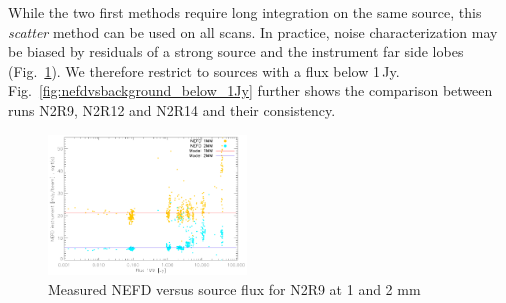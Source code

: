 While the two first methods require long integration on the same source, this
\emph{scatter} method can be used on all scans. In practice, noise
characterization may be biased by residuals of a strong source and the
instrument far side lobes (Fig.~\ref{fig:nefdvsbackground}). We therefore
restrict to sources with a flux below
1\,Jy. Fig.~\ref{fig:nefdvsbackground_below_1Jy} further shows the comparison
between runs N2R9, N2R12 and N2R14 and their consistency.

\begin{figure}
\begin{center}
\includegraphics[clip=true,width=0.47\textwidth]{Figures/NEFDIndScans/nefd_flux1mm_run22.pdf}
\caption[Measured NEFD versus source flux for N2R9 at 1 and 2 mm]{Measured NEFD
  versus source flux for N2R9 at 1 and 2 mm}
\label{fig:nefdvsbackground}
\end{center}
\end{figure}


